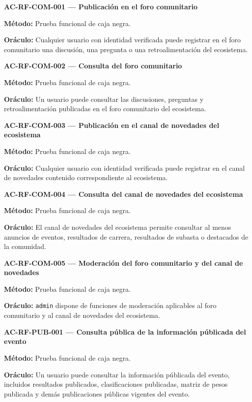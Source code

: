 \documentclass[10pt,letterpaper]{article}
\begin{document}
\noindent\textbf{AC-RF-COM-001 --- Publicación en el foro comunitario}\par
\textbf{Método:} Prueba funcional de caja negra.\par
\textbf{Oráculo:} Cualquier usuario con identidad verificada puede registrar en el foro comunitario una discusión, una pregunta o una retroalimentación del ecosistema.\par\vspace{0.45em}
\noindent\textbf{AC-RF-COM-002 --- Consulta del foro comunitario}\par
\textbf{Método:} Prueba funcional de caja negra.\par
\textbf{Oráculo:} Un usuario puede consultar las discusiones, preguntas y retroalimentación publicadas en el foro comunitario del ecosistema.\par\vspace{0.45em}
\noindent\textbf{AC-RF-COM-003 --- Publicación en el canal de novedades del ecosistema}\par
\textbf{Método:} Prueba funcional de caja negra.\par
\textbf{Oráculo:} Cualquier usuario con identidad verificada puede registrar en el canal de novedades contenido correspondiente al ecosistema.\par\vspace{0.45em}
\noindent\textbf{AC-RF-COM-004 --- Consulta del canal de novedades del ecosistema}\par
\textbf{Método:} Prueba funcional de caja negra.\par
\textbf{Oráculo:} El canal de novedades del ecosistema permite consultar al menos anuncios de eventos, resultados de carrera, resultados de subasta o destacados de la comunidad.\par\vspace{0.45em}
\noindent\textbf{AC-RF-COM-005 --- Moderación del foro comunitario y del canal de novedades}\par
\textbf{Método:} Prueba funcional de caja negra.\par
\textbf{Oráculo:} \texttt{admin} dispone de funciones de moderación aplicables al foro comunitario y al canal de novedades del ecosistema.\par\vspace{0.45em}
\noindent\textbf{AC-RF-PUB-001 --- Consulta pública de la información públicada del evento}\par
\textbf{Método:} Prueba funcional de caja negra.\par
\textbf{Oráculo:} Un usuario puede consultar la información públicada del evento, incluidos resultados publicados, clasificaciones publicadas, matriz de pesos publicada y demás publicaciones públicas vigentes del evento.\par\vspace{0.45em}
\end{document}
